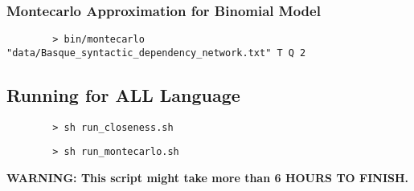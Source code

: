 \documentclass[12pt, a4paper]{article}
\begin{document}
\subsubsection{Montecarlo Approximation for Binomial Model}

\begin{listing}[H]
    \begin{verbatim}
        > bin/montecarlo "data/Basque_syntactic_dependency_network.txt" T Q 2
    \end{verbatim}
\end{listing}

\subsection{Running for ALL Language}

\begin{listing}[H]
    \begin{verbatim}
        > sh run_closeness.sh
    \end{verbatim}
\end{listing}

\begin{listing}[H]
    \begin{verbatim}
        > sh run_montecarlo.sh
    \end{verbatim}
\end{listing}

\textbf{WARNING: This script might take more than 6 HOURS TO FINISH.}
\end{document}
